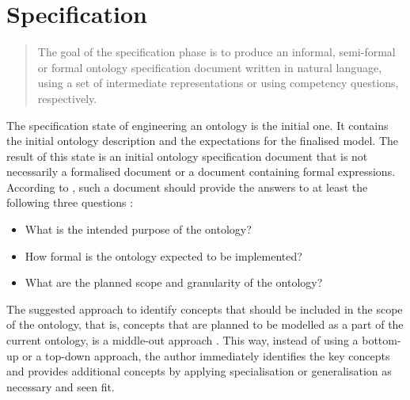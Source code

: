 \chapter{Specification}\label{ch: Specification}


\blockquote[{{\cite[p. 2]{fernandez-lopez1997METHONTOLOGYOntologicalArt}}}]{The goal of the specification phase is to produce an informal, semi-formal or formal ontology specification document written in natural language, using a set of intermediate representations or using competency questions, respectively.}

The specification state of engineering an ontology is the initial one. It contains the initial ontology description and the expectations for the finalised model. The result of this state is an initial ontology specification document that is not necessarily a formalised document or a document containing formal expressions. According to \citeauthor{fernandez-lopez1997METHONTOLOGYOntologicalArt}, such a document should provide the answers to at least the following three questions
\cite{fernandez-lopez1997METHONTOLOGYOntologicalArt}%
:

\begin{itemize}
    \item What is the intended purpose of the ontology?
    \item How formal is the ontology expected to be implemented?
    \item What are the planned scope and granularity of the ontology?
\end{itemize}

The suggested approach to identify concepts that should be included in the scope of the ontology, that is, concepts that are planned to be modelled as a part of the current ontology, is a middle-out approach \cite{fernandez-lopez1997METHONTOLOGYOntologicalArt,uschold1996OntologiesPrinciplesMethods}. This way, instead of using a bottom-up or a top-down approach, the author immediately identifies the key concepts and provides additional concepts by applying specialisation or generalisation as necessary and seen fit.

